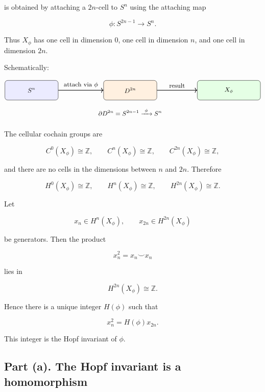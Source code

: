 \documentclass[12pt,a4paper]{article}
\theoremstyle{notespace}
\begin{document}
is obtained by attaching a \(2n\)-cell to \(S^n\) using the attaching map

\[
\phi:S^{2n-1}\to S^n.
\]

Thus \(X_\phi\) has one cell in dimension \(0\), one cell in dimension \(n\), and one cell in dimension \(2n\).

Schematically:

\[
\begin{tikzpicture}[scale=1.0, every node/.style={font=\small}]
	\node[draw, rounded corners, fill=blue!8, minimum width=2.7cm, minimum height=1cm] (A) at (0,0) {\(S^n\)};
	\node[draw, rounded corners, fill=orange!12, minimum width=2.7cm, minimum height=1cm] (B) at (5,0) {\(D^{2n}\)};
	\node[draw, rounded corners, fill=green!10, minimum width=3.2cm, minimum height=1cm] (C) at (10,0) {\(X_\phi\)};
	
	\draw[->, thick] (A) -- node[above] {attach via \(\phi\)} (B);
	\draw[->, thick] (B) -- node[above] {result} (C);
	
	\node at (5,-1.1) {\(\partial D^{2n}=S^{2n-1}\xrightarrow{\ \phi\ }S^n\)};
\end{tikzpicture}
\]

The cellular cochain groups are

\[
C^0(X_\phi)\cong \mathbb Z,
\qquad
C^n(X_\phi)\cong \mathbb Z,
\qquad
C^{2n}(X_\phi)\cong \mathbb Z,
\]

and there are no cells in the dimensions between \(n\) and \(2n\). Therefore

\[
H^0(X_\phi)\cong \mathbb Z,
\qquad
H^n(X_\phi)\cong \mathbb Z,
\qquad
H^{2n}(X_\phi)\cong \mathbb Z.
\]

Let

\[
x_n\in H^n(X_\phi),
\qquad
x_{2n}\in H^{2n}(X_\phi)
\]

be generators. Then the product

\[
x_n^2=x_n\smile x_n
\]

lies in

\[
H^{2n}(X_\phi)\cong \mathbb Z.
\]

Hence there is a unique integer \(H(\phi)\) such that

\[
\boxed{
	x_n^2=H(\phi)x_{2n}.
}
\]

This integer is the Hopf invariant of \(\phi\).

\subsection{Part (a). The Hopf invariant is a homomorphism}
\end{document}
